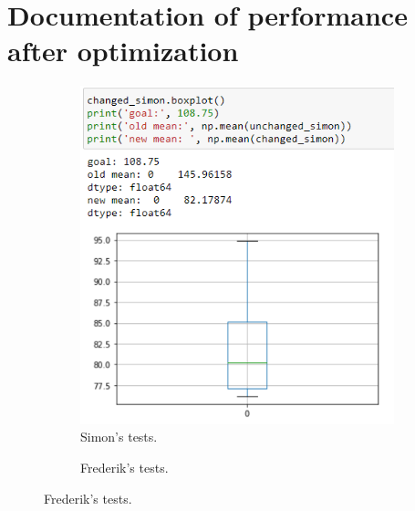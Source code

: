 \documentclass[parskip=full]{scrartcl}
\begin{document}
\section{Documentation of performance after optimization}
\begin{figure}[!hb]
    \centering %
    \begin{subfigure}[b]{0.35\textwidth}
        \caption{Simon's tests.} 
        \includegraphics[width=\textwidth]{simon_changed.PNG}
    \end{subfigure}
    \begin{subfigure}[b]{0.35\textwidth}
        \caption{Frederik's tests.} 

\end{subfigure}
\end{figure}
\end{document}
